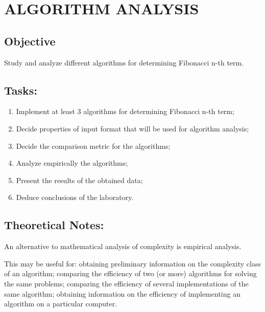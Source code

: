 \documentclass[12pt]{article}
\begin{document}
\clearpage
\setcounter{page}{3}
\pagestyle{fancy}

\setcounter{page}{2}
\pagestyle{fancy}
\fancyhf{}
\rhead{\thepage}

\section*{ALGORITHM ANALYSIS}


\subsection*{Objective  }

Study and analyze different algorithms for determining Fibonacci n-th term. 


\subsection*{Tasks:}

\begin{enumerate}[itemsep=1pt]
  \item Implement at least 3 algorithms for determining Fibonacci n-th term; 
  \item Decide properties of input format that will be used for algorithm analysis; 
  \item Decide the comparison metric for the algorithms; 
  \item Analyze empirically the algorithms; 
  \item Present the results of the obtained data; 
  \item Deduce conclusions of the laboratory.  
\end{enumerate}

\subsection*{Theoretical Notes:}
\hspace{0.7cm} An alternative to mathematical analysis of complexity is empirical analysis. 

This may be useful for: obtaining preliminary information on the complexity class of an 
algorithm; comparing the efficiency of two (or more) algorithms for solving the same problems; 
comparing the efficiency of several implementations of the same algorithm; obtaining information on the 
efficiency of implementing an algorithm on a particular computer. 
\end{document}
